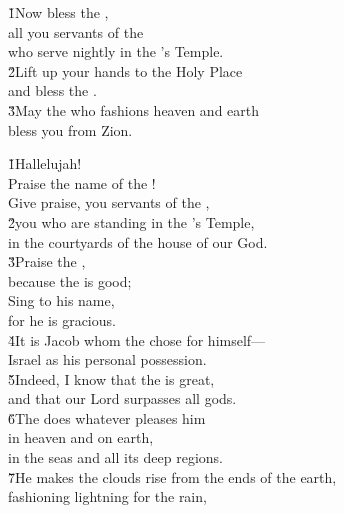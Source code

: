 \begin{poetry}
\poeml \v{1}Now bless the , \\
\poemll    all you servants of the  \\
\poemlll       who serve nightly in the 's Temple. \\
\poeml \v{2}Lift up your hands to the Holy Place \\
\poemll    and bless the . \\
\poeml \v{3}May the  who fashions heaven and earth \\
\poemll    bless you from Zion.
\end{poetry}

\begin{poetry}
\poeml \v{1}Hallelujah! \\
\poemll    Praise the name of the ! \\
\poeml Give praise, you servants of the , \\
\poeml \v{2}you who are standing in the 's Temple, \\
\poemlll       in the courtyards of the house of our God. \\
\poeml \v{3}Praise the , \\
\poemll    because the  is good; \\
\poeml Sing to his name, \\
\poemll    for he is gracious. \\
\poeml \v{4}It is Jacob whom the  chose for himself--- \\
\poemll    Israel as his personal possession. \\
\poeml \v{5}Indeed, I know that the  is great, \\
\poemll    and that our Lord surpasses all gods. \\
\poeml \v{6}The  does whatever pleases him \\
\poemll    in heaven and on earth, \\
\poemlll       in the seas and all its deep regions. \\
\poeml \v{7}He makes the clouds rise from the ends of the earth, \\
\poemll    fashioning lightning for the rain, \\

\end{poetry}
